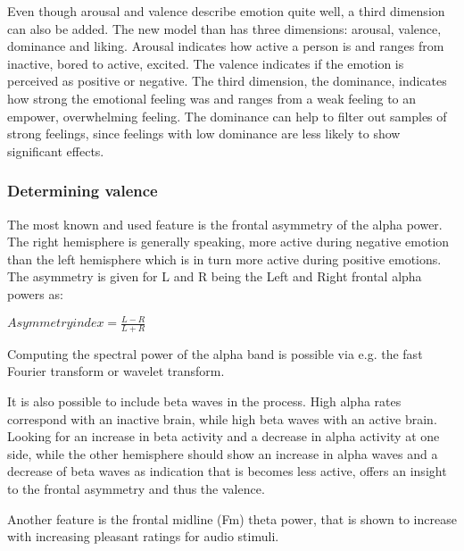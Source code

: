 \npar
Even though arousal and valence describe emotion quite well, a third dimension can also be added. The new model than has three dimensions: arousal, valence, dominance and liking. Arousal indicates how active a person is and ranges from inactive, bored to active, excited. The valence indicates if the emotion is perceived as positive or negative. The third dimension, the dominance, indicates how strong the emotional feeling was and ranges from a weak feeling to an empower, overwhelming feeling. The dominance can help to filter out samples of strong feelings, since feelings with low dominance are less likely to show significant effects.


\subsubsection{Determining valence}
\label{DetValence}

The most known and used feature is the frontal asymmetry of the alpha power\cite{GivenPaper}.
The right hemisphere is generally speaking, more active during negative emotion than the left hemisphere which is in turn more active during positive emotions\cite{RealTimeEEGEmotion,EEGDatasets}. The asymmetry is given for L and R being the Left and Right frontal alpha powers as:\\
\begin{center}
$Asymmetry index = \frac{L-R}{L+R}$
\end{center}
Computing the spectral power of the alpha band is possible via e.g. the fast Fourier transform or wavelet transform.

\npar

It is also possible to include beta waves in the process. High alpha rates correspond with an inactive brain, while high beta waves with an active brain. Looking for an increase in beta activity and a decrease in alpha activity at one side, while the other hemisphere should show an increase in alpha waves and a decrease of beta waves as indication that is becomes less active, offers an insight to the frontal asymmetry and thus the valence\cite{ExtendedPaper}. 

\npar

Another feature is the frontal midline (Fm) theta power, that is shown to increase with increasing pleasant ratings for audio stimuli\cite{MusicPaper}. %

